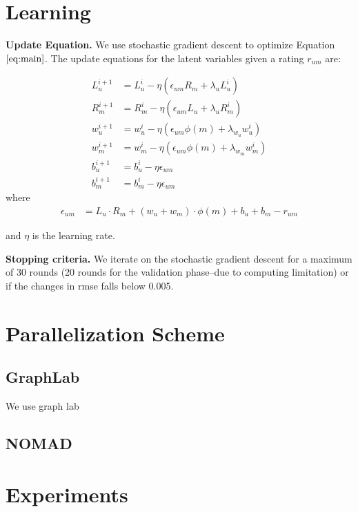 \documentclass{article} %
\begin{document}
\section{Learning}

  \textbf{Update Equation.}   We use stochastic gradient descent to optimize
Equation $\ref{eq:main}$. The update equations for the latent variables given
a rating $r_{um}$ are:

	\begin{align}
	L_u^{i+1} &= L_u^{i} - \eta ( \epsilon_{um} R_m  + \lambda_u L_u^i)\\
	R_m^{i+1} &= R_m^{i} - \eta ( \epsilon_{um} L_u  + \lambda_u R_m^i)\\
	w_u^{i+1} &= w_u^{i} - \eta ( \epsilon_{um} \phi(m) + \lambda_{w_u} w_u^i)\\
	w_m^{i+1} &= w_m^{i} - \eta ( \epsilon_{um} \phi(m) + \lambda_{w_m} w_m^i)\\
	b_u^{i+1} &= b_u^{i} - \eta \epsilon_{um}\\
	b_m^{i+1} &= b_m^{i} - \eta \epsilon_{um}
	\end{align}
	where
	\begin{align}
		\epsilon_{um} &= L_u \cdot R_m + (w_u + w_m) \cdot \phi(m) + b_u + b_m - r_{um}
	\end{align}

and $\eta$ is the learning rate.

  \textbf{Stopping criteria.}   We iterate on the stochastic gradient descent
for a maximum of 30 rounds (20 rounds for the validation phase--due to
computing limitation)   or if the changes in rmse falls below 0.005.

\section{Parallelization Scheme}

	\subsection{GraphLab}

	We use graph lab

	\subsection{NOMAD}

\section{Experiments}
\end{document}
